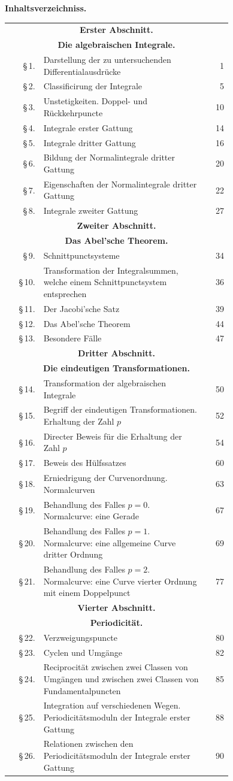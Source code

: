 \documentclass[10pt]{article}
\newcommand{\tocentry}[3]{\S\,#1 & #2 & #3\\}
\newcommand{\tocsec}[2]{\multicolumn{3}{c}{\bfseries #1}\\[-0.15em]\multicolumn{3}{c}{\bfseries #2}\\[0.25em]}
\begin{document}
\clearpage



\begin{center}
{\Large\bfseries Inhaltsverzeichniss.}
\end{center}

{\scriptsize
\begin{longtable}{@{}r@{\ }p{0.74\linewidth}@{\ }r@{}}
\tocsec{Erster Abschnitt.}{Die algebraischen Integrale.}
\tocentry{1.}{Darstellung der zu untersuchenden Differentialausdrücke}{1}
\tocentry{2.}{Classificirung der Integrale}{5}
\tocentry{3.}{Unstetigkeiten. Doppel- und Rückkehrpuncte}{10}
\tocentry{4.}{Integrale erster Gattung}{14}
\tocentry{5.}{Integrale dritter Gattung}{16}
\tocentry{6.}{Bildung der Normalintegrale dritter Gattung}{20}
\tocentry{7.}{Eigenschaften der Normalintegrale dritter Gattung}{22}
\tocentry{8.}{Integrale zweiter Gattung}{27}
\tocsec{Zweiter Abschnitt.}{Das Abel'sche Theorem.}
\tocentry{9.}{Schnittpunctsysteme}{34}
\tocentry{10.}{Transformation der Integralsummen, welche einem Schnittpunctsystem entsprechen}{36}
\tocentry{11.}{Der Jacobi'sche Satz}{39}
\tocentry{12.}{Das Abel'sche Theorem}{44}
\tocentry{13.}{Besondere Fälle}{47}
\tocsec{Dritter Abschnitt.}{Die eindeutigen Transformationen.}
\tocentry{14.}{Transformation der algebraischen Integrale}{50}
\tocentry{15.}{Begriff der eindeutigen Transformationen. Erhaltung der Zahl $p$}{52}
\tocentry{16.}{Directer Beweis für die Erhaltung der Zahl $p$}{54}
\tocentry{17.}{Beweis des Hülfssatzes}{60}
\tocentry{18.}{Erniedrigung der Curvenordnung. Normalcurven}{63}
\tocentry{19.}{Behandlung des Falles $p=0$. Normalcurve: eine Gerade}{67}
\tocentry{20.}{Behandlung des Falles $p=1$. Normalcurve: eine allgemeine Curve dritter Ordnung}{69}
\tocentry{21.}{Behandlung des Falles $p=2$. Normalcurve: eine Curve vierter Ordnung mit einem Doppelpunct}{77}
\tocsec{Vierter Abschnitt.}{Periodicität.}
\tocentry{22.}{Verzweigungspuncte}{80}
\tocentry{23.}{Cyclen und Umgänge}{82}
\tocentry{24.}{Reciprocität zwischen zwei Classen von Umgängen und zwischen zwei Classen von Fundamentalpuncten}{85}
\tocentry{25.}{Integration auf verschiedenen Wegen. Periodicitätsmoduln der Integrale erster Gattung}{88}
\tocentry{26.}{Relationen zwischen den Periodicitätsmoduln der Integrale erster Gattung}{90}

\end{longtable}}
\end{document}
